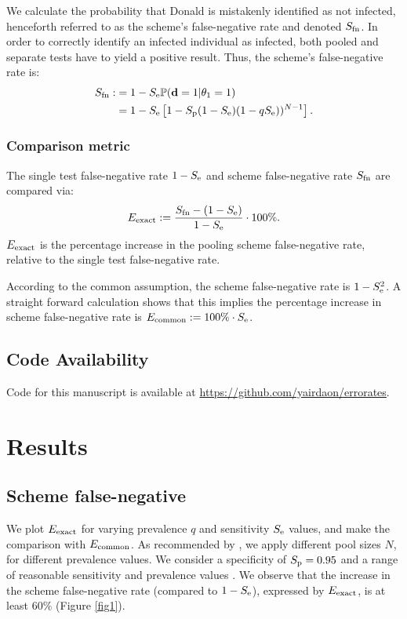 \documentclass{article}
\begin{document}
We calculate the probability that Donald is mistakenly identified as
not infected, henceforth referred to as the scheme's false-negative
rate and denoted $S_{\text{fn}}$. In order to correctly identify an infected
individual as infected, both pooled and separate tests have to yield a
positive result. Thus, the scheme's false-negative rate is:
\begin{align}\label{eq:sfn}
    \begin{split}
        S_{\text{fn}} :&= 1 - S_\text{e}\mathbb{P}(\mathbf{d}=1|\theta_1=1)\\
        &= 1 - S_\text{e}\left [1 - S_\text{p}(1-S_\text{e})(1-qS_\text{e}))^{N-1}\right].
    \end{split}
\end{align}

\subsubsection*{Comparison metric}
The single test false-negative rate $1-S_\text{e}$ and scheme false-negative
rate $S_{\text{fn}}$ are compared via:
\begin{equation}\label{eq:erel}
E_{\text{{exact}}} := \frac{S_{\text{fn}} - (1-S_\text{e})}{1-S_\text{e}} \cdot 100\%.
\end{equation}
$E_{\text{{exact}}}$ is the percentage increase in the pooling scheme
false-negative rate, relative to the single test false-negative rate.

According to the common assumption, the scheme false-negative rate is
$1-S_\text{e}^2$. A straight forward calculation shows that this implies the
percentage increase in scheme false-negative rate is $E_{\text{{common}}} :=
100\%\cdot S_\text{e}$.

\subsection*{Code Availability}
Code for this manuscript is available at
\url{https://github.com/yairdaon/errorates}.

\section*{Results}\label{section:results}
\subsection*{Scheme false-negative}
We plot $E_{\text{{exact}}}$ for varying prevalence $q$ and sensitivity $S_\text{e}$
values, and make the comparison with $E_{\text{{common}}}$. As recommended by
\cite{DorfmanYuvalDor}, we apply different pool sizes $N$, for
different prevalence values. We consider a specificity of $S_\text{p}=0.95$
\cite{DorfmanYuvalDor} and a range of reasonable sensitivity and
prevalence values \cite{KitComparison, InterpretingCOVID19Test,
  EstimatingRatesLourenco, FalsePositiveEstimate}. We observe that the
increase in the scheme false-negative rate (compared to $1-S_\text{e}$),
expressed by $E_{\text{{exact}}}$, is at least $60\%$ (Figure \ref{fig1}).
\end{document}
